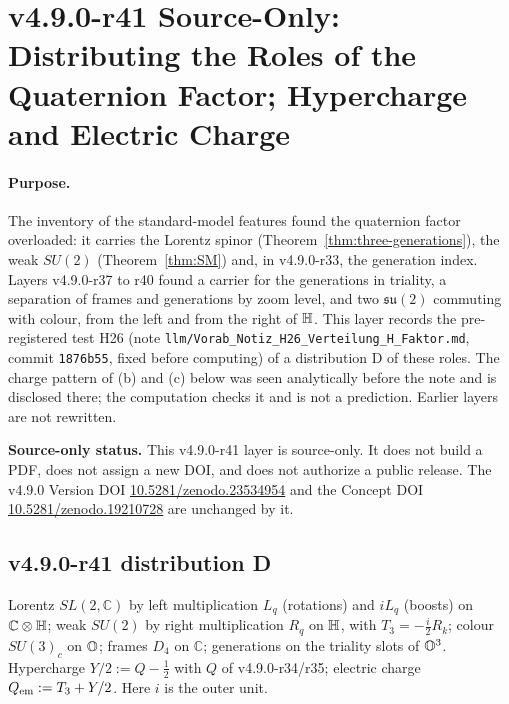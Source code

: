 \section*{v4.9.0-r41 Source-Only: Distributing the Roles of the Quaternion Factor; Hypercharge and Electric Charge}
\label{sec:v490-r41-quaternion-roles}

\paragraph{Purpose.}
The inventory of the standard-model features found the quaternion factor overloaded: it carries the Lorentz spinor
(Theorem~\ref{thm:three-generations}), the weak \(SU(2)\) (Theorem~\ref{thm:SM}) and, in v4.9.0-r33, the generation index.  Layers
v4.9.0-r37 to r40 found a carrier for the generations in triality, a separation of frames and generations by zoom level, and two
\(\mathfrak{su}(2)\) commuting with colour, from the left and from the right of \(\mathbb{H}\).  This layer records the pre-registered test H26
(note \texttt{llm/Vorab\_Notiz\_H26\_Verteilung\_H\_Faktor.md}, commit \texttt{1876b55}, fixed before computing) of a distribution D of
these roles.  The charge pattern of (b) and (c) below was seen analytically before the note and is disclosed there; the computation
checks it and is not a prediction.  Earlier layers are not rewritten.

\noindent\textbf{Source-only status.}
This v4.9.0-r41 layer is source-only.  It does not build a PDF, does not assign a new DOI,
and does not authorize a public release.  The v4.9.0 Version DOI
\href{https://doi.org/10.5281/zenodo.23534954}{10.5281/zenodo.23534954} and the Concept DOI
\href{https://doi.org/10.5281/zenodo.19210728}{10.5281/zenodo.19210728} are unchanged by it.

\subsection*{v4.9.0-r41 distribution D}
\label{subsec:v490-r41-distribution}

Lorentz \(SL(2,\mathbb C)\) by left multiplication \(L_q\) (rotations) and \(iL_q\) (boosts) on \(\mathbb C\otimes\mathbb{H}\); weak \(SU(2)\) by
right multiplication \(R_q\) on \(\mathbb{H}\), with \(T_3=-\tfrac{i}{2}R_k\); colour \(SU(3)_c\) on \(\mathbb{O}\); frames \(D_4\) on \(\mathbb C\); generations on
the triality slots of \(\mathbb{O}^3\).  Hypercharge \(Y/2:=Q-\tfrac12\) with \(Q\) of v4.9.0-r34/r35; electric charge \(Q_{\rm em}:=T_3+Y/2\).  Here \(i\)
is the outer unit.

